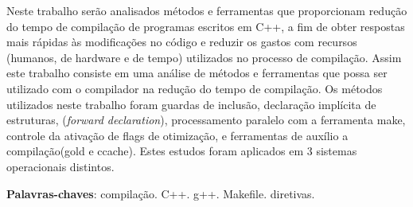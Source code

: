 \begin{resumo}
Neste trabalho serão analisados métodos e ferramentas
 que proporcionam redução do tempo de compilação
 de programas escritos em C++, a fim de obter respostas mais
 rápidas às modificações no código e reduzir os gastos com recursos
 (humanos, de hardware e de tempo) utilizados no processo
 de compilação. Assim este trabalho consiste em uma análise de
 métodos e ferramentas que possa ser utilizado com o compilador
  na redução do tempo de compilação. Os métodos utilizados neste
 trabalho foram guardas de inclusão, declaração implícita de estruturas,
 (\textit{forward declaration}), processamento paralelo com a ferramenta make,
 controle da ativação de flags de otimização, e ferramentas de auxílio
 a compilação(gold e ccache). Estes estudos foram aplicados em 3
 sistemas operacionais distintos.
 \vspace{\onelineskip}
    
 \noindent
 \textbf{Palavras-chaves}: compilação. C++. g++. Makefile. diretivas.

\end{resumo}
